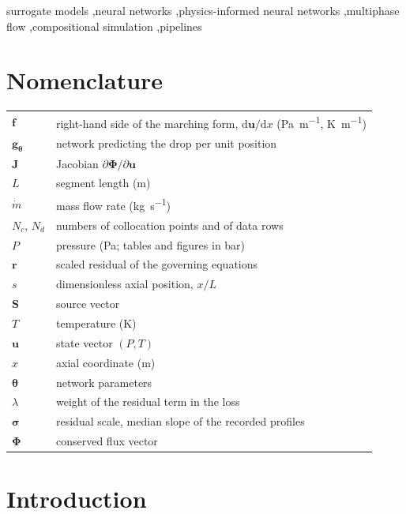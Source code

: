 \documentclass[a4paper,fleqn]{cas-sc}
\newcommand{\mdot}{\dot{m}}
\newcommand{\dd}{\mathrm{d}}
\newcommand{\bPhi}{\boldsymbol{\Phi}}
\newcommand{\bS}{\mathbf{S}}
\newcommand{\bu}{\mathbf{u}}
\newcommand{\bJ}{\mathbf{J}}
\newcommand{\br}{\mathbf{r}}
\newcommand{\btheta}{\boldsymbol{\theta}}
\begin{document}
\begin{keywords}
surrogate models \sep neural networks \sep physics-informed neural networks \sep multiphase flow \sep compositional simulation \sep pipelines
\end{keywords}

\maketitle

\section*{Nomenclature}
\begin{tabular}{@{}ll@{}}
$\mathbf{f}$ & right-hand side of the marching form, $\dd\bu/\dd x$ (\si{\pascal\per\metre}, \si{\kelvin\per\metre}) \\
$\mathbf{g}_{\btheta}$ & network predicting the drop per unit position \\
$\bJ$ & Jacobian $\partial\bPhi/\partial\bu$ \\
$L$ & segment length (\si{\metre}) \\
$\mdot$ & mass flow rate (\si{\kilogram\per\second}) \\
$N_c$, $N_d$ & numbers of collocation points and of data rows \\
$P$ & pressure (\si{\pascal}; tables and figures in bar) \\
$\br$ & scaled residual of the governing equations \\
$s$ & dimensionless axial position, $x/L$ \\
$\bS$ & source vector \\
$T$ & temperature (\si{\kelvin}) \\
$\bu$ & state vector $(P, T)$ \\
$x$ & axial coordinate (\si{\metre}) \\
$\btheta$ & network parameters \\
$\lambda$ & weight of the residual term in the loss \\
$\boldsymbol{\sigma}$ & residual scale, median slope of the recorded profiles \\
$\bPhi$ & conserved flux vector \\
\end{tabular}

\section{Introduction}\label{sec:intro}
\end{document}
